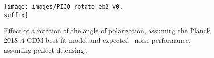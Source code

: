 \documentclass[PICOReport.tex]{subfiles}
\begin{document}
\begin{figure}[htb]
\texttt{[image: images/PICO\_rotate\_eb2\_v0.\\suffix]}
\caption{\label{fig:rot_bb_tb_eb} Effect of a rotation of the angle of polarization, assuming the Planck 2018 $\Lambda$-CDM best fit model \citep{Planck2018_VI} and expected \pico\ noise performance, assuming perfect delensing .}
\end{figure}
%
%
%
\end{document}

